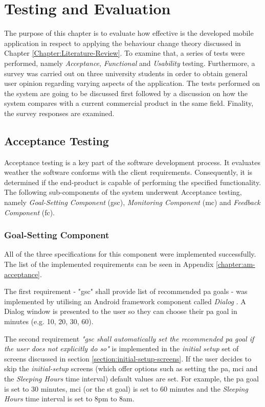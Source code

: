 \chapter{Testing and Evaluation}
\label{chapter:testing-and-eval}
The purpose of this chapter is to evaluate how effective is the developed mobile application in respect to applying the behaviour change theory discussed in Chapter \ref{Chapter:Literature-Review}. To examine that, a series of tests were performed, namely \textit{Acceptance}, \textit{Functional} and \textit{Usability} testing. Furthermore, a survey was carried out on three university students in order to obtain general user opinion regarding varying aspects of the application. The tests performed on the system are going to be discussed first followed by a discussion on how the system compares with a current commercial product in the same field. Finality, the survey responses are examined.

\section{Acceptance Testing}
Acceptance testing is a key part of the software development process. It evaluates weather the software conforms with the client requirements. Consequently, it is determined if the end-product is capable of performing the specified functionality. The following sub-components of the system underwent Acceptance testing, namely \textit{Goal-Setting Component} (\gls{gsc}), \textit{Monitoring Component} (\gls{mc}) and \textit{Feedback Component} (\gls{fc}).

\subsection{Goal-Setting Component}
All of the three specifications for this component were implemented successfully. The list of the implemented requirements can be seen in Appendix \ref{chapter:am-acceptance}.

The first requirement - "\gls{gsc}" shall provide list of recommended \gls{pa} goals - was implemented by utilising an Android framework component called \textit{Dialog} \citep{androiddialogs_2017}. A Dialog window is presented to the user so they can choose their \gls{pa} goal in minutes (e.g. 10, 20, 30, 60).

The second requirement \textit{"\gls{gsc} shall automatically set the recommended \gls{pa} goal if the user does not explicitly do so"} is implemented in the \textit{initial setup} set of screens discussed in section \ref{section:initial-setup-screens}. If the user decides to skip the \textit{initial-setup} screens (which offer options such as setting the \gls{pa}, \gls{mci} and the \textit{Sleeping Hours} time interval) default values are set. For example, the \gls{pa} goal is set to 30 minutes, \gls{mci} (or the \gls{st} goal) is set to 60 minutes and the \textit{Sleeping Hours} time interval is set to 8pm to 8am.

